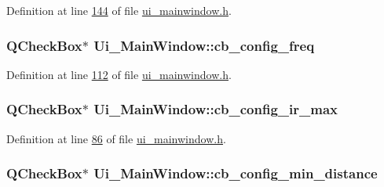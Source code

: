 Definition at line \hyperlink{a00052_source_l00144}{144} of file \hyperlink{a00052_source}{ui\+\_\+mainwindow.\+h}.

\hypertarget{a00027_a8f501acefacd6343a4ec99a67172f256}{
\subsubsection[{cb\+\_\+config\+\_\+freq}]{\setlength{\rightskip}{0pt plus 5cm}Q\+Check\+Box$\ast$ Ui\+\_\+\+Main\+Window\+::cb\+\_\+config\+\_\+freq}}\label{a00027_a8f501acefacd6343a4ec99a67172f256}


Definition at line \hyperlink{a00052_source_l00112}{112} of file \hyperlink{a00052_source}{ui\+\_\+mainwindow.\+h}.

\hypertarget{a00027_ae78fd3c777d081ab1ec1d0142bec3320}{
\subsubsection[{cb\+\_\+config\+\_\+ir\+\_\+max}]{\setlength{\rightskip}{0pt plus 5cm}Q\+Check\+Box$\ast$ Ui\+\_\+\+Main\+Window\+::cb\+\_\+config\+\_\+ir\+\_\+max}}\label{a00027_ae78fd3c777d081ab1ec1d0142bec3320}


Definition at line \hyperlink{a00052_source_l00086}{86} of file \hyperlink{a00052_source}{ui\+\_\+mainwindow.\+h}.

\hypertarget{a00027_a6b0d09f3b380fdb810d3da3f5208ccf5}{
\subsubsection[{cb\+\_\+config\+\_\+min\+\_\+distance}]{\setlength{\rightskip}{0pt plus 5cm}Q\+Check\+Box$\ast$ Ui\+\_\+\+Main\+Window\+::cb\+\_\+config\+\_\+min\+\_\+distance}}\label{a00027_a6b0d09f3b380fdb810d3da3f5208ccf5}


